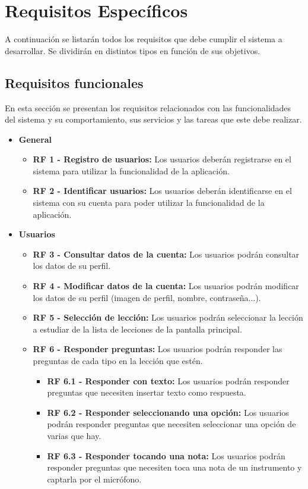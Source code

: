 \section{Requisitos Específicos}
A continuación se listarán todos los requisitos que debe cumplir el sistema a desarrollar. Se dividirán en distintos tipos en función de sus objetivos.

\subsection{Requisitos funcionales}
En esta sección se presentan los requisitos relacionados con las funcionalidades del sistema y su comportamiento, sus servicios y las tareas que este debe realizar.

\begin{itemize}
    \item \textbf{General}
          \begin{itemize}
              \item \textbf{RF 1 - Registro de usuarios: }Los usuarios deberán registrarse en el sistema para utilizar la funcionalidad de la aplicación.
              \item \textbf{RF 2 - Identificar usuarios: }Los usuarios deberán identificarse en el sistema con su cuenta para poder utilizar la funcionalidad de la aplicación.

          \end{itemize}
    \item \textbf{Usuarios}
          \begin{itemize}
              \item \textbf{RF 3 - Consultar datos de la cuenta: }Los usuarios podrán consultar los datos de su perfil.
              \item \textbf{RF 4 - Modificar datos de la cuenta: }Los usuarios podrán modificar los datos de su perfil (imagen de perfil, nombre, contraseña...).
              \item \textbf{RF 5 - Selección de lección: }Los usuarios podrán seleccionar la lección a estudiar de la lista de lecciones de la pantalla principal.
              \item \textbf{RF 6 - Responder preguntas: }Los usuarios podrán responder las preguntas de cada tipo en la lección que estén.
                    \begin{itemize}
                        \item \textbf{RF 6.1 - Responder con texto: }Los usuarios podrán responder preguntas que necesiten insertar texto como respuesta.
                        \item \textbf{RF 6.2 - Responder seleccionando una opción: }Los usuarios podrán responder preguntas que necesiten seleccionar una opción de varias que hay.
                        \item \textbf{RF 6.3 - Responder tocando una nota: }Los usuarios podrán responder preguntas que necesiten toca una nota de un instrumento y captarla por el micrófono.
                    \end{itemize}


\end{itemize}
\end{itemize}
